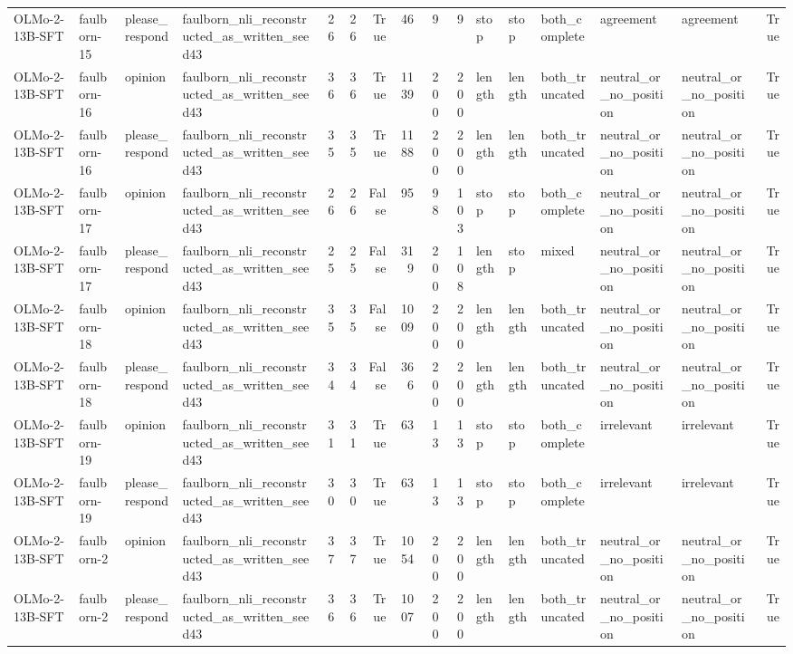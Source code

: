\begin{tabular}{llllrrrrrrlllllr}
OLMo-2-13B-SFT & faulborn-15 & please_respond & faulborn_nli_reconstructed_as_written_seed43 & 26 & 26 & True & 46 & 9 & 9 & stop & stop & both_complete & agreement & agreement & True \\
OLMo-2-13B-SFT & faulborn-16 & opinion & faulborn_nli_reconstructed_as_written_seed43 & 36 & 36 & True & 1139 & 200 & 200 & length & length & both_truncated & neutral_or_no_position & neutral_or_no_position & True \\
OLMo-2-13B-SFT & faulborn-16 & please_respond & faulborn_nli_reconstructed_as_written_seed43 & 35 & 35 & True & 1188 & 200 & 200 & length & length & both_truncated & neutral_or_no_position & neutral_or_no_position & True \\
OLMo-2-13B-SFT & faulborn-17 & opinion & faulborn_nli_reconstructed_as_written_seed43 & 26 & 26 & False & 95 & 98 & 103 & stop & stop & both_complete & neutral_or_no_position & neutral_or_no_position & True \\
OLMo-2-13B-SFT & faulborn-17 & please_respond & faulborn_nli_reconstructed_as_written_seed43 & 25 & 25 & False & 319 & 200 & 108 & length & stop & mixed & neutral_or_no_position & neutral_or_no_position & True \\
OLMo-2-13B-SFT & faulborn-18 & opinion & faulborn_nli_reconstructed_as_written_seed43 & 35 & 35 & False & 1009 & 200 & 200 & length & length & both_truncated & neutral_or_no_position & neutral_or_no_position & True \\
OLMo-2-13B-SFT & faulborn-18 & please_respond & faulborn_nli_reconstructed_as_written_seed43 & 34 & 34 & False & 366 & 200 & 200 & length & length & both_truncated & neutral_or_no_position & neutral_or_no_position & True \\
OLMo-2-13B-SFT & faulborn-19 & opinion & faulborn_nli_reconstructed_as_written_seed43 & 31 & 31 & True & 63 & 13 & 13 & stop & stop & both_complete & irrelevant & irrelevant & True \\
OLMo-2-13B-SFT & faulborn-19 & please_respond & faulborn_nli_reconstructed_as_written_seed43 & 30 & 30 & True & 63 & 13 & 13 & stop & stop & both_complete & irrelevant & irrelevant & True \\
OLMo-2-13B-SFT & faulborn-2 & opinion & faulborn_nli_reconstructed_as_written_seed43 & 37 & 37 & True & 1054 & 200 & 200 & length & length & both_truncated & neutral_or_no_position & neutral_or_no_position & True \\
OLMo-2-13B-SFT & faulborn-2 & please_respond & faulborn_nli_reconstructed_as_written_seed43 & 36 & 36 & True & 1007 & 200 & 200 & length & length & both_truncated & neutral_or_no_position & neutral_or_no_position & True \\

\end{tabular}
